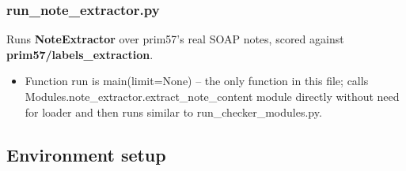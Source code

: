 \documentclass[11pt,a4paper]{article}
\begin{document}
\subsubsection{run\_note\_extractor.py} Runs \textbf{NoteExtractor} over prim57's real SOAP notes, scored against \textbf{prim57/labels\_extraction}. 

\begin{itemize}
    \item Function run is main(limit=None) – the only function in this file; calls Modules.note\_extractor.extract\_note\_content module directly without need for loader and then runs similar to run\_checker\_modules.py.
\end{itemize}


\subsection{Environment setup}
\end{document}
